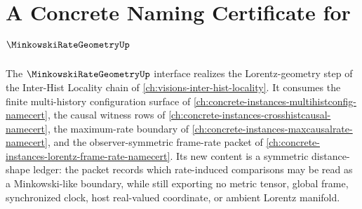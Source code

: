 \chapter{A Concrete Naming Certificate for $\MinkowskiRateGeometryUp$}
\label{ch:concrete-instances-minkowski-rate-geometry-namecert}

The $\MinkowskiRateGeometryUp$ interface realizes the Lorentz-geometry step of the Inter-Hist Locality chain of \autoref{ch:visions-inter-hist-locality}. It consumes the finite multi-history configuration surface of \autoref{ch:concrete-instances-multihistconfig-namecert}, the causal witness rows of \autoref{ch:concrete-instances-crosshistcausal-namecert}, the maximum-rate boundary of \autoref{ch:concrete-instances-maxcausalrate-namecert}, and the observer-symmetric frame-rate packet of \autoref{ch:concrete-instances-lorentz-frame-rate-namecert}. Its new content is a symmetric distance-shape ledger: the packet records which rate-induced comparisons may be read as a Minkowski-like boundary, while still exporting no metric tensor, global frame, synchronized clock, host real-valued coordinate, or ambient Lorentz manifold.


